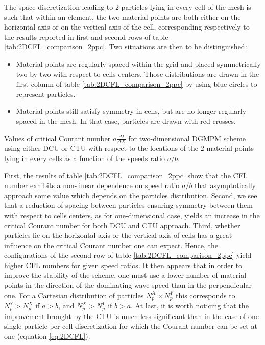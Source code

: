 The space discretization leading to $2$ particles lying in every cell of the mesh is such that within an element, the two material points are both either on the horizontal axis or on the vertical axis of the cell, corresponding respectively to the results reported in first and second rows of table \ref{tab:2DCFL_comparison_2ppc}. Two situations are then to be distinguished:
\begin{itemize}
\item Material points are regularly-spaced within the grid and placed symmetrically two-by-two with respect to cells centers. Those distributions are drawn in the first column of table \ref{tab:2DCFL_comparison_2ppc} by using blue circles to represent particles.
\item Material points still satisfy symmetry in cells, but are no longer regularly-spaced in the mesh. In that case, particles are drawn with red crosses.
\end{itemize}
\begin{table}[h]
  \centering
  
  \caption{Values of critical Courant number $a\frac{\Delta t}{\Delta X}$ for two-dimensional DGMPM scheme using either DCU or CTU with respect to the locations of the $2$ material points lying in every cells as a function of the speeds ratio $a/b$.}
  \label{tab:2DCFL_comparison_2ppc}
\end{table}
First, the results of table \ref{tab:2DCFL_comparison_2ppc} show that the CFL number exhibits a non-linear dependence on speed ratio $a/b$ that asymptotically approach some value which depends on the particles distribution. Second, we see that a reduction of spacing between particles ensuring symmetry between them with respect to cells centers, as for one-dimensional case, yields an increase in the critical Courant number for both DCU and CTU approach. 
Third, whether particles lie on the horizontal axis or the vertical axis of cells has a great influence on the critical Courant number one can expect. Hence, the configurations of the second row of table \ref{tab:2DCFL_comparison_2ppc} yield higher CFL numbers for given speed ratios. It then appears that in order to improve the stability of the scheme, one must use a lower number of material points in the direction of the dominating wave speed than in the perpendicular one. For a Cartesian distribution of particles $N_p^X \times N_p^Y$ this corresponds to $N_p^Y > N_p^X$ if $a>b$, and $N_p^X > N_p^Y$ if $b>a$.
At last, it is worth noticing that the improvement brought by the CTU is much less significant than in the case of one single particle-per-cell discretization for which the Courant number can be set at one (equation \eqref{eq:2DCFL}).

